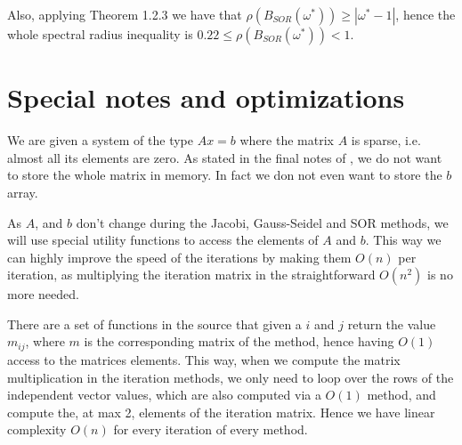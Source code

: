 \documentclass[12pt]{article}
\begin{document}
Also, applying Theorem 1.2.3 \cite{MN2:1} we have that $\rho (B_{SOR}(\omega^*)) \geq |\omega^* - 1|$, hence the whole spectral radius inequality is $0.22 \leq \rho (B_{SOR}(\omega^*)) < 1 $.

\section{Special notes and optimizations}
\label{notes:begin}

We are given a system of the type $Ax = b$ where the matrix $A$ is sparse, i.e. almost all its elements are zero.
As stated in the final notes of \cite{MN2:1}, we do not want to store the whole matrix in memory. 
In fact we don not even want to store the $b$ array.

As $A$, and $b$ don't change during the Jacobi, Gauss-Seidel and SOR methods, we will use special utility functions to access the elements of $A$ and $b$.
This way we can highly improve the speed of the iterations by making them $O(n)$ per iteration, as multiplying the iteration matrix in the straightforward $O(n^2)$ is no more needed.

There are a set of functions in the source that given a $i$ and $j$ return the value $m_{ij}$, where $m$ is the corresponding matrix of the method, hence having $O(1)$ access to the matrices elements.
This way, when we compute the matrix multiplication in the iteration methods, we only need to loop over the rows of the independent vector values, which are also computed via a $O(1)$ method, and compute the, at max 2, elements of the iteration matrix.
Hence we have linear complexity $O(n)$ for every iteration of every method.



\end{document}
